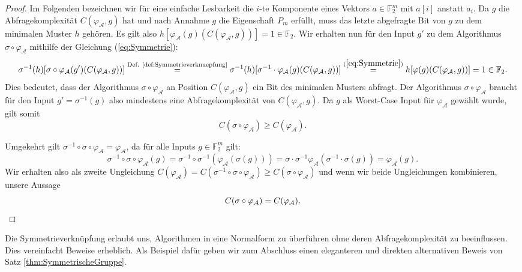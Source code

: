 \documentclass[10pt,a4paper, footheight=1mm]{scrreprt}
\theoremstyle{definition}
\begin{document}
\begin{proof}
Im Folgenden bezeichnen wir für eine einfache Lesbarkeit die
$i$-te Komponente eines Vektors $a\in\mathbb{F}_2^m$ mit
$a[i]$ anstatt $a_i$.
Da $g$ die Abfragekomplexität $C(\varphi_\mathcal{A}, g)$
hat und nach Annahme $g$ die Eigenschaft $P_m$ erfüllt,
muss das letzte abgefragte Bit von $g$ zu dem
minimalen Muster $h$ gehören. Es gilt also 
$h[\varphi_\mathcal{A}(g)(C(\varphi_\mathcal{A}, g))]= 1 \in \mathbb{F}_2$.
Wir erhalten nun für den Input $g'$ zu dem
Algorithmus $\sigma \circ \varphi_\mathcal{A}$ mithilfe der 
Gleichung (\ref{eq:Symmetrie}):
$$\sigma^{-1}(h)[\sigma \circ \varphi_\mathcal{A}(g')(C(\varphi_\mathcal{A}, g))]
\overset{\textup{Def. \ref{def:Symmetrieverknuepfung}}}{=}
\sigma^{-1}(h)[\sigma^{-1} \cdot \varphi_\mathcal{A}(g)(C(\varphi_\mathcal{A}, g))]
\overset{(\ref{eq:Symmetrie})}{=}
h[\varphi(g)(C(\varphi_\mathcal{A}, g))]
= 1 \in \mathbb{F}_2.$$
Dies bedeutet, dass der Algorithmus $\sigma \circ \varphi_\mathcal{A}$ an Position
$C(\varphi_\mathcal{A}, g)$ ein Bit des minimalen Musters abfragt.
Der Algorithmus $\sigma \circ \varphi_\mathcal{A}$ braucht für den
Input $g'=\sigma^{-1}(g)$ also mindestens eine Abfragekomplexität
von $C(\varphi_\mathcal{A}, g)$. Da $g$ als Worst-Case Input für
$\varphi_\mathcal{A}$ gewählt wurde, gilt somit
$$ C(\sigma \circ \varphi_\mathcal{A}) \geq C(\varphi_\mathcal{A}).$$

Umgekehrt gilt
$\sigma^{-1}\circ \sigma \circ \varphi_\mathcal{A} = \varphi_\mathcal{A}$,
da für alle Inputs $g\in\mathbb{F}_2^m$ gilt:
$$\sigma^{-1}\circ \sigma \circ \varphi_\mathcal{A}(g)
= \sigma^{-1} \circ \sigma^{-1}(\varphi_\mathcal{A}(\sigma(g)))
= \sigma \cdot \sigma^{-1} \varphi_\mathcal{A}(\sigma^{-1}\cdot \sigma(g))
= \varphi_\mathcal{A}(g).
$$
Wir erhalten also als zweite Ungleichung
$C(\varphi_\mathcal{A}) = C(\sigma^{-1}\circ \sigma \circ \varphi_\mathcal{A})
\geq C(\sigma \circ \varphi_\mathcal{A})$
und wenn wir beide Ungleichungen kombinieren, unsere Aussage
\begin{equation*}
C(\sigma \circ \varphi_\mathcal{A}) = C(\varphi_\mathcal{A}).
\qedhere
\end{equation*}
\end{proof}
Die Symmetrieverknüpfung erlaubt uns, Algorithmen
in eine Normalform zu überführen ohne deren Abfragekomplexität
zu beeinflussen. Dies vereinfacht Beweise erheblich.
Als Beispiel dafür geben wir zum Abschluss einen eleganteren und
direkten alternativen
Beweis von Satz \ref{thm:SymmetrischeGruppe}.
\end{document}

